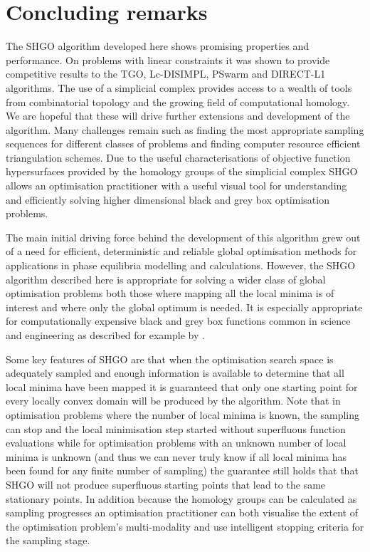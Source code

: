 \chapter{Concluding remarks}
The SHGO algorithm developed here shows promising properties and performance. On problems with linear constraints it was shown to provide competitive results to the TGO, Lc-DISIMPL, PSwarm and DIRECT-L1 algorithms. The use of a simplicial complex provides access to a wealth of tools from combinatorial topology and the growing field of computational homology. We are hopeful that these will drive further extensions and development of the algorithm. Many challenges remain such as finding the most appropriate sampling sequences for different classes of problems and finding computer resource efficient triangulation schemes. Due to the useful characterisations of objective function hypersurfaces provided by the homology groups of the simplicial complex SHGO allows an optimisation practitioner with a useful visual tool for understanding and efficiently solving higher dimensional black and grey box optimisation problems.

The main initial driving force behind the development of this algorithm grew out of a need for efficient, deterministic and reliable global optimisation methods for applications in phase equilibria modelling and calculations. However, the SHGO algorithm described here is appropriate for solving a wider class of global optimisation problems both those where mapping all the local minima is of interest and where only the global optimum is needed. It is especially appropriate for computationally expensive black and grey box functions common in science and engineering as described for example by \citet{Shan2010}.
 
Some key features of SHGO are that when the optimisation search space is adequately sampled and enough information is available to determine that all local minima have been mapped it is guaranteed that only one starting point for every locally convex domain will be produced by the algorithm. Note that in optimisation problems where the number of local minima is known, the sampling can stop and the local minimisation step started without superfluous function evaluations while for optimisation problems with an unknown number of local minima is unknown (and thus we can never truly know if all local minima has been found for any finite number of sampling) the guarantee still holds that that SHGO will not produce superfluous starting points that lead to the same stationary points. In addition because the homology groups can be calculated as sampling progresses an optimisation practitioner can both visualise the extent of the optimisation problem's multi-modality and use intelligent stopping criteria for the sampling stage.



